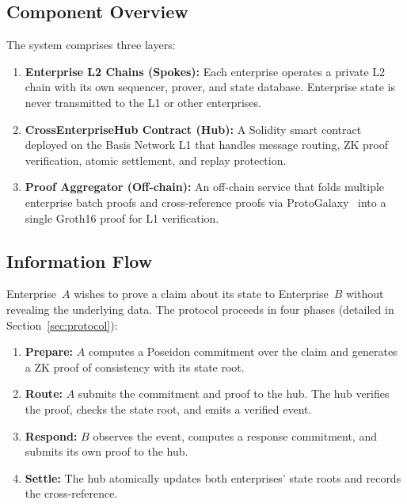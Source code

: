 \documentclass[conference]{IEEEtran}
\begin{document}
\subsection{Component Overview}

The system comprises three layers:

\begin{enumerate}
  \item \textbf{Enterprise L2 Chains (Spokes):} Each enterprise operates a
        private L2 chain with its own sequencer, prover, and state database.
        Enterprise state is never transmitted to the L1 or other enterprises.
  \item \textbf{CrossEnterpriseHub Contract (Hub):} A Solidity smart contract
        deployed on the Basis Network L1 that handles message routing, ZK
        proof verification, atomic settlement, and replay protection.
  \item \textbf{Proof Aggregator (Off-chain):} An off-chain service that
        folds multiple enterprise batch proofs and cross-reference proofs via
        ProtoGalaxy~\cite{rul10} into a single Groth16 proof for L1
        verification.
\end{enumerate}

\subsection{Information Flow}

Enterprise~$A$ wishes to prove a claim about its state to Enterprise~$B$
without revealing the underlying data. The protocol proceeds in four phases
(detailed in Section~\ref{sec:protocol}):

\begin{enumerate}
  \item \textbf{Prepare:} $A$ computes a Poseidon commitment over the claim
        and generates a ZK proof of consistency with its state root.
  \item \textbf{Route:} $A$ submits the commitment and proof to the hub. The
        hub verifies the proof, checks the state root, and emits a verified
        event.
  \item \textbf{Respond:} $B$ observes the event, computes a response
        commitment, and submits its own proof to the hub.
  \item \textbf{Settle:} The hub atomically updates both enterprises' state
        roots and records the cross-reference.
\end{enumerate}
\end{document}
